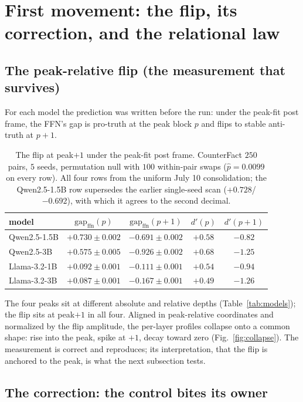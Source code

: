 \documentclass[11pt]{article}
\begin{document}
\section{First movement: the flip, its correction, and the relational law}
\label{sec:flip}

\subsection{The peak-relative flip (the measurement that survives)}

For each model the prediction was written before the run: under the
peak-fit post frame, the FFN's gap is pro-truth at the peak block $p$ and
flips to stable anti-truth at $p{+}1$.

\begin{table}[H]
\centering
\caption{The flip at peak$+1$ under the peak-fit post frame. CounterFact
$250$ pairs, $5$ seeds, permutation null with $100$ within-pair swaps
($\hat p = 0.0099$ on every row). All four rows from the uniform July 10
consolidation; the Qwen2.5-1.5B row supersedes the earlier single-seed scan
($+0.728$/$-0.692$), with which it agrees to the second decimal.}
\label{tab:flip}
\begin{tabular}{lcccc}
\toprule
model & $\mathrm{gap}_{\mathrm{ffn}}(p)$ & $\mathrm{gap}_{\mathrm{ffn}}(p{+}1)$ & $d'(p)$ & $d'(p{+}1)$ \\
\midrule
Qwen2.5-1.5B & $+0.730 \pm 0.002$ & $-0.691 \pm 0.002$ & $+0.58$ & $-0.82$ \\
Qwen2.5-3B   & $+0.575 \pm 0.005$ & $-0.926 \pm 0.002$ & $+0.68$ & $-1.25$ \\
Llama-3.2-1B & $+0.092 \pm 0.001$ & $-0.111 \pm 0.001$ & $+0.54$ & $-0.94$ \\
Llama-3.2-3B & $+0.087 \pm 0.001$ & $-0.167 \pm 0.001$ & $+0.49$ & $-1.26$ \\
\bottomrule
\end{tabular}
\end{table}

The four peaks sit at different absolute and relative depths
(Table~\ref{tab:models}); the flip sits at peak$+1$ in all four. Aligned in
peak-relative coordinates and normalized by the flip amplitude, the
per-layer profiles collapse onto a common shape: rise into the peak, spike
at $+1$, decay toward zero (Fig.~\ref{fig:collapse}). The measurement is
correct and reproduces; its interpretation, that the flip is anchored to
the peak, is what the next subsection tests.

\subsection{The correction: the control bites its owner}
\label{sec:correction}
\end{document}
